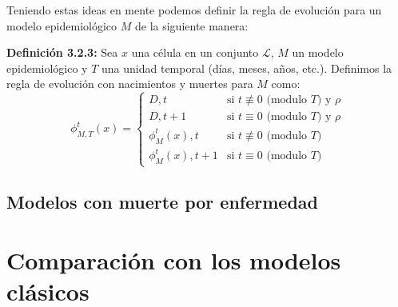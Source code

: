 Teniendo estas ideas en mente podemos definir la regla de evolución para un modelo epidemiológico $M$ de la siguiente manera:

\textbf{Definición 3.2.3:} Sea $x$ una célula en un conjunto $\mathcal{L}$, $M$ un modelo epidemiológico y $T$ una unidad temporal (días, meses, años, etc.). Definimos la regla de evolución con nacimientos y muertes para $M$ como:
\begin{equation}
    \phi_{M,T}^t(x)=\left\{\begin{array}{ll}
        D,t & \text{si }t\not\equiv 0 \text{ (modulo }T\text{) y }\rho\\
        D,t+1 & \text{si }t\equiv 0 \text{ (modulo }T\text{) y }\rho\\
        \phi_M^t(x),t & \text{si }t\not\equiv 0 \text{ (modulo }T)\\
        \phi_M^t(x),t+1 & \text{si }t\equiv 0 \text{ (modulo }T)
    \end{array}\right.
\end{equation}


\subsection{Modelos con muerte por enfermedad}
\section{Comparación con los modelos clásicos}